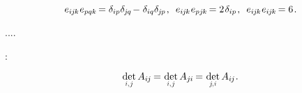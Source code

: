 \nopagebreak\vspace{-0.3em}\begin{equation}\label{doublepermutationscontracted}
e_{i\hspace{-0.1ex}j\hspace{-0.1ex}k} \hspace{.1ex} e_{pqk} \hspace{-0.25ex} = \delta_{ip} \delta_{\hspace{-0.1ex}j\hspace{-0.1ex}q} \hspace{-0.25ex} - \hspace{.1ex} \delta_{iq} \delta_{\hspace{-0.1ex}j\hspace{-0.1ex}p}
\hspace{.2ex} ,
\hspace{.5em}
%
e_{i\hspace{-0.1ex}j\hspace{-0.1ex}k} \hspace{.1ex} e_{pj\hspace{-0.1ex}k} \hspace{-0.25ex} = 2 \hspace{.2ex} \delta_{ip}
\hspace{.2ex} ,
\hspace{.5em}
%
e_{i\hspace{-0.1ex}j\hspace{-0.1ex}k} \hspace{.1ex} e_{i\hspace{-0.1ex}j\hspace{-0.1ex}k} \hspace{-0.25ex} = 6
\hspace{.2ex} .
\end{equation}

....

\::

\nopagebreak\vspace{-0.25em}\begin{equation*}
\underset{\raisebox{.15em}{\scalebox{.7}{$i$,$\hspace{.15ex}j$}}}{\operatorname{det}} \, A_{i\hspace{-0.1ex}j} \hspace{-0.16ex}
= \hspace{.1ex} \underset{\raisebox{.15em}{\scalebox{.7}{$i$,$\hspace{.15ex}j$}}}{\operatorname{det}} \, A_{j\hspace{-0.06ex}i} \hspace{-0.16ex}
= \hspace{.1ex} \underset{\raisebox{.15em}{\scalebox{.7}{$j\hspace{-0.2ex}$,$\hspace{.1ex}i$}}}{\operatorname{det}} \, A_{i\hspace{-0.1ex}j}
\hspace{.1ex} .
\end{equation*}

